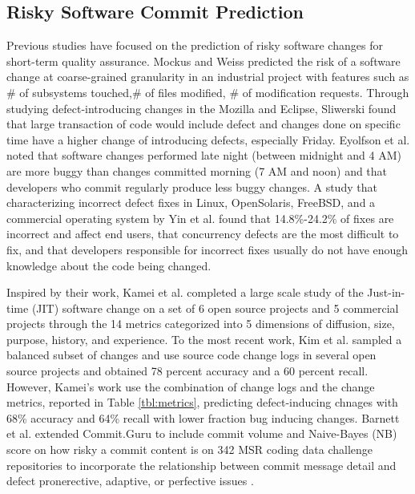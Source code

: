 \documentclass[10pt,conference]{IEEEtran}
\begin{document}
\subsection{Risky Software Commit Prediction}

Previous studies have focused on the prediction of risky software changes for short-term quality assurance. Mockus and Weiss predicted the risk of a software change at coarse-grained granularity in an industrial project with features such as \# of subsystems touched,\# of files modified, \# of modification requests. Through studying defect-introducing changes in the Mozilla and Eclipse, Sliwerski \cite{Sliwerski05changes} found that large transaction of code would include defect and changes done on specific time have a higher change of introducing defects, especially Friday. Eyolfson et al. \cite{Eyolfson11bugginess} noted that software changes performed late night (between midnight and 4 AM) are more buggy than changes committed morning (7 AM and noon) and that developers who commit regularly produce less buggy changes.  A study
that characterizing incorrect defect fixes in Linux, OpenSolaris, FreeBSD, and a commercial operating system by Yin et al. \cite{Yin11fixes} found that 14.8\%-24.2\%  of fixes are incorrect and affect end users, that concurrency defects are the most difficult to fix, and that developers responsible for incorrect fixes usually do not have enough knowledge about the code being changed.

Inspired by their work, Kamei et al. \cite{kamei12_jit} completed a large scale study of the Just-in-time (JIT) software change on a set of 6 open source projects and 5 commercial projects through the 14 metrics categorized into 5 dimensions of diffusion, size, purpose, history, and experience. To the most recent work, Kim et al. \cite{Kim08changes} sampled a balanced subset of changes and use source code change logs in several open source projects and obtained 78 percent
accuracy and a 60 percent recall. However, Kamei's work use the combination of change logs and the change metrics, reported in Table \ref{tbl:metrics}, predicting defect-inducing chnages with 68\% accuracy and 64\% recall with lower fraction bug inducing changes. 
Barnett et al. extended Commit.Guru to include commit volume and Naive-Bayes (NB) score on how risky a commit content is on 342 MSR coding data challenge repositories to incorporate the relationship between commit message detail and defect pronerective, adaptive, or perfective issues \cite{barnett13_mcontent}.  
\end{document}
